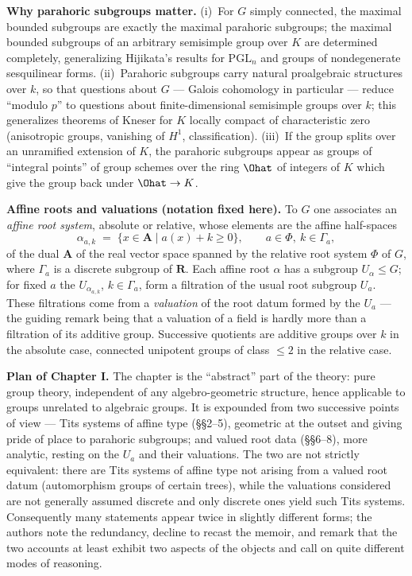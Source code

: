 \documentclass[12pt,a4paper,oneside,english]{smfart}
\theoremstyle{definition}
\theoremstyle{bt}
\begin{document}
\medskip
\noindent\textbf{Why parahoric subgroups matter.} (i)~For $G$ simply
connected, the maximal bounded subgroups are exactly the maximal parahoric subgroups; the maximal bounded subgroups of an arbitrary semisimple group over $K$ are determined completely, generalizing Hijikata's results for $\mathrm{PGL}_n$ and groups of nondegenerate sesquilinear forms. (ii)~Parahoric subgroups carry natural proalgebraic structures over $k$, so that questions about $G$ --- Galois cohomology in particular --- reduce ``modulo $p$'' to questions about finite-dimensional semisimple groups over $k$; this generalizes theorems of Kneser for $K$ locally compact of characteristic zero (anisotropic groups, vanishing of $H^1$, classification). (iii)~If the group splits over an unramified extension of $K$, the parahoric subgroups appear as groups of ``integral points'' of group schemes over the ring $\Ohat$ of integers of $K$ which give the group back under $\Ohat\rightarrow K$.

\medskip
\noindent\textbf{Affine roots and valuations (notation fixed here).} To $G$
one associates an \emph{affine root system}, absolute or relative, whose elements are the affine half-spaces
\[
  \alpha_{a,k}\;=\;\{x\in\mathbf{A}\mid a(x)+k\geqslant 0\},
  \qquad a\in\Phi,\ k\in\Gamma_a,
\]
of the dual $\mathbf{A}$ of the real vector space spanned by the relative root system $\Phi$ of $G$, where $\Gamma_a$ is a discrete subgroup of $\mathbf{R}$. Each affine root $\alpha$ has a subgroup $U_\alpha\leqslant G$; for fixed $a$ the $U_{\alpha_{a,k}}$, $k\in\Gamma_a$, form a filtration of the usual root subgroup $U_a$. These filtrations come from a \emph{valuation} of the root datum formed by the $U_a$ --- the guiding remark being that a valuation of a field is hardly more than a filtration of its additive group. Successive quotients are additive groups over $k$ in the absolute case, connected unipotent groups of class $\leqslant 2$ in the relative case.

\medskip
\noindent\textbf{Plan of Chapter I.} The chapter is the ``abstract'' part of
the theory: pure group theory, independent of any algebro-geometric structure, hence applicable to groups unrelated to algebraic groups. It is expounded from two successive points of view --- Tits systems of affine type (\S\S2--5), geometric at the outset and giving pride of place to parahoric subgroups; and valued root data (\S\S6--8), more analytic, resting on the $U_a$ and their valuations. The two are not strictly equivalent: there are Tits systems of affine type not arising from a valued root datum (automorphism groups of certain trees), while the valuations considered are not generally assumed discrete and only discrete ones yield such Tits systems. Consequently many statements appear twice in slightly different forms; the authors note the redundancy, decline to recast the memoir, and remark that the two accounts at least exhibit two aspects of the objects and call on quite different modes of reasoning.
\end{document}
